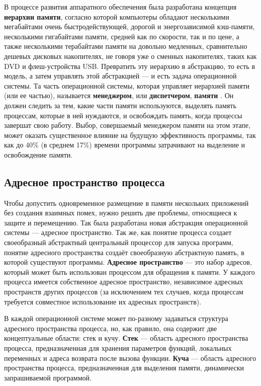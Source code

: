 В процессе развития аппаратного обеспечения была разработана концепция \textbf{иерархии памяти}, согласно которой компьютеры обладают несколькими мегабайтами очень быстродействующей, дорогой и энергозависимой кэш-памяти, несколькими гигабайтами памяти, средней как по скорости, так и по цене, а также несколькими терабайтами памяти на довольно медленных, сравнительно дешевых дисковых накопителях, не говоря уже о сменных накопителях, таких как DVD и флеш-устройства USB. Превратить эту иерархию в абстракцию, то есть в модель, а затем управлять этой абстракцией --- и есть задача операционной системы. Та часть операционной системы, которая управляет иерархией памяти (или ее частью), называется \textbf{менеджером}, или \textbf{диспетчером}, \textbf{памяти} \cite{tannenbaum}. Он должен следить за тем, какие части памяти используются, выделять память процессам, которые в ней нуждаются, и освобождать память, когда процессы завершат свою работу. Выбор, совершаемый менеджером памяти на этом этапе, может оказать существенное влияние на будущую эффективность программы, так как до 40\% (в среднем 17\%) времени программы затрачивают на выделение и освобождение памяти. \cite{cornell}

\subsection{Адресное пространство процесса}

Чтобы допустить одновременное размещение в памяти нескольких приложений без создания взаимных помех, нужно решить две проблемы, относящиеся к защите и перемещению. Так была разработана новая абстракция операционной системы --- адресное пространство. Так же, как понятие процесса создает своеобразный абстрактный центральный процессор для запуска программ, понятие адресного пространства создаёт своеобразную абстрактную память, в которой существуют программы. \textbf{Адресное пространство} \cite{tannenbaum} --- это набор адресов, который может быть использован процессом для обращения к памяти. У каждого процесса имеется собственное адресное пространство, независимое адресных пространств других процессов (за исключением тех случаев, когда процессам требуется совместное использование их адресных пространств).

В каждой операционной системе может по-разному задаваться структура адресного пространства процесса, но, как правило, она содержит две концептуальные области: стек и кучу. \textbf{Стек} \cite{windows} --- область адресного пространства процесса, предназначенная для хранения параметров функций, локальных переменных и адреса возврата после вызова функции. \textbf{Куча} \cite{linux} --- область адресного пространства процесса, предназначенная для выделения памяти, динамически запрашиваемой программой.

